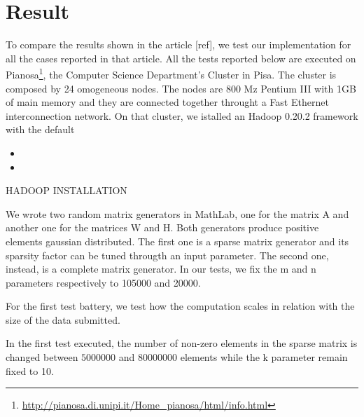 \section{Result}
\label{result}

To compare the results shown in the article [ref], we test our implementation for all the cases reported in that article. All the tests reported below are executed on Pianosa\footnote{\url{http://pianosa.di.unipi.it/Home_pianosa/html/info.html}}, the Computer Science Department's Cluster in Pisa. The cluster is composed by 24 omogeneous nodes. The nodes are 800 Mz Pentium III with 1GB of main memory and they are connected together throught a Fast Ethernet interconnection network. On that cluster, we istalled an Hadoop 0.20.2 framework with the default 

\begin{itemize}
\item 
\item 

\end{itemize}
HADOOP INSTALLATION




We wrote two random matrix generators in MathLab, one for the matrix A and another one for the matrices W and H. Both generators produce positive elements gaussian distributed. The first one is a sparse matrix generator and its sparsity factor can be tuned througth an input parameter. The second one, instead, is a complete matrix generator. In our tests, we fix the m and n parameters respectively to 105000 and 20000.

For the first test battery, we test how the computation scales in relation with the size of the data submitted. 

In the first test executed, the number of non-zero elements in the sparse matrix is changed between $5000000$ and $80000000$ elements while the k parameter remain fixed to 10. 


